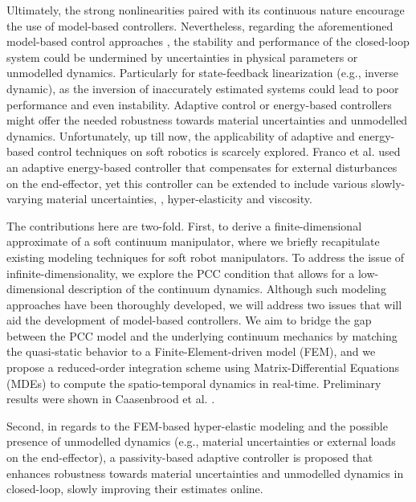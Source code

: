 Ultimately, the strong nonlinearities paired with its continuous nature encourage the use of model-based controllers. Nevertheless, regarding the aforementioned model-based control approaches \cite{DellaSantina2020,Katzschmann2019,Falkenhahn2015}, the stability and performance of the closed-loop system could be undermined by uncertainties in physical parameters or unmodelled dynamics. Particularly for state-feedback linearization (e.g., inverse dynamic), as the inversion of inaccurately estimated systems could lead to poor performance and even instability. Adaptive control \cite{Slotine1988,Morgan1977} or energy-based controllers \cite{Ortega1998} might offer the needed robustness towards material uncertainties and unmodelled dynamics. Unfortunately, up till now, the applicability of adaptive and energy-based control techniques on soft robotics is scarcely explored. Franco et al. \cite{Franco2020} used an adaptive energy-based controller that compensates for external disturbances on the end-effector, yet this controller can be extended to include various slowly-varying material uncertainties, \eg, hyper-elasticity and viscosity.


The contributions here are two-fold. First, to derive a finite-dimensional approximate of a soft continuum manipulator, where we briefly recapitulate existing modeling techniques for soft robot manipulators. To address the issue of infinite-dimensionality, we explore the PCC condition that allows for a low-dimensional description of the continuum dynamics. Although such modeling approaches have been thoroughly developed, we will address two issues that will aid the development of model-based controllers. We aim to bridge the gap between the PCC model and the underlying continuum mechanics by matching the quasi-static behavior to a Finite-Element-driven model (FEM), and we propose a reduced-order integration scheme using Matrix-Differential Equations (MDEs) to compute the spatio-temporal dynamics in real-time. Preliminary results were shown in Caasenbrood et al. \cite{Caasenbrood2020,Caasenbrood2022}.
%

Second, in regards to the FEM-based hyper-elastic modeling and the possible presence of unmodelled dynamics (e.g., material uncertainties or external loads on the end-effector), a passivity-based adaptive controller is proposed that enhances robustness towards material uncertainties and unmodelled dynamics in closed-loop, slowly improving their estimates online.\vfill


